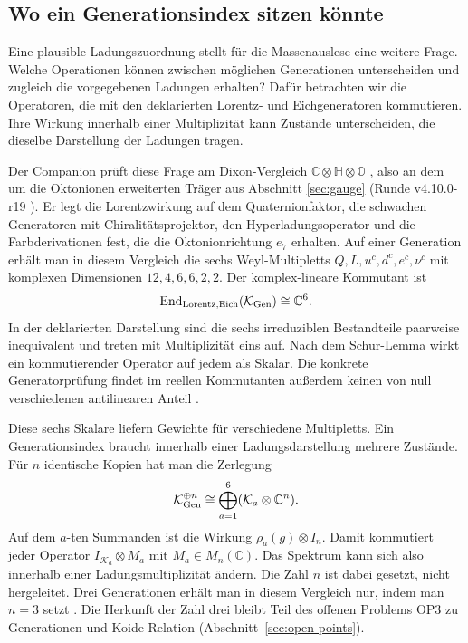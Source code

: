 \subsection{Wo ein Generationsindex sitzen könnte}
\label{sec:charged-multiplicity}

Eine plausible Ladungszuordnung stellt für die Massenauslese eine weitere Frage. Welche Operationen können zwischen möglichen Generationen unterscheiden und zugleich die vorgegebenen Ladungen erhalten? Dafür betrachten wir die Operatoren, die mit den deklarierten Lorentz- und Eichgeneratoren kommutieren. Ihre Wirkung innerhalb einer Multiplizität kann Zustände unterscheiden, die dieselbe Darstellung der Ladungen tragen.

Der Companion prüft diese Frage am Dixon-Vergleich \(\mathbb C\otimes\mathbb H\otimes\mathbb O\) \cite{dixon}, also an dem um die Oktonionen erweiterten Träger aus Abschnitt \ref{sec:gauge} (Runde v4.10.0-r19 \cite{dixon-commutant}). Er legt die Lorentzwirkung auf dem Quaternionfaktor, die schwachen Generatoren mit Chiralitätsprojektor, den Hyperladungsoperator und die Farbderivationen fest, die die Oktonionrichtung \(e_7\) erhalten. Auf einer Generation erhält man in diesem Vergleich die sechs Weyl-Multipletts \(Q,L,u^c,d^c,e^c,\nu^c\) mit komplexen Dimensionen \(12,4,6,6,2,2\). Der komplex-lineare Kommutant ist
\begin{equation}
 \operatorname{End}_{\mathrm{Lorentz},\mathrm{Eich}}(\mathcal K_{\rm Gen})
       \cong \mathbb C^6 .
 \label{eq:gauge-one-copy}
\end{equation}
In der deklarierten Darstellung sind die sechs irreduziblen Bestandteile paarweise inequivalent und treten mit Multiplizität eins auf. Nach dem Schur-Lemma wirkt ein kommutierender Operator auf jedem als Skalar. Die konkrete Generatorprüfung findet im reellen Kommutanten außerdem keinen von null verschiedenen antilinearen Anteil \cite{dixon-commutant}.

Diese sechs Skalare liefern Gewichte für verschiedene Multipletts. Ein Generationsindex braucht innerhalb einer Ladungsdarstellung mehrere Zustände. Für \(n\) identische Kopien hat man die Zerlegung
\[
 \mathcal K_{\rm Gen}^{\oplus n}
   \cong \bigoplus_{a=1}^{6}(\mathcal K_a\otimes\mathbb C^n).
\]
Auf dem \(a\)-ten Summanden ist die Wirkung \(\rho_a(g)\otimes I_n\). Damit kommutiert jeder Operator \(I_{\mathcal K_a}\otimes M_a\) mit \(M_a\in M_n(\mathbb C)\). Das Spektrum kann sich also innerhalb einer Ladungsmultiplizität ändern. Die Zahl \(n\) ist dabei gesetzt, nicht hergeleitet. Drei Generationen erhält man in diesem Vergleich nur, indem man \(n=3\) setzt \cite{dixon-commutant,dixon-copies}. Die Herkunft der Zahl drei bleibt Teil des offenen Problems OP3 zu Generationen und Koide-Relation (Abschnitt~\ref{sec:open-points}).

